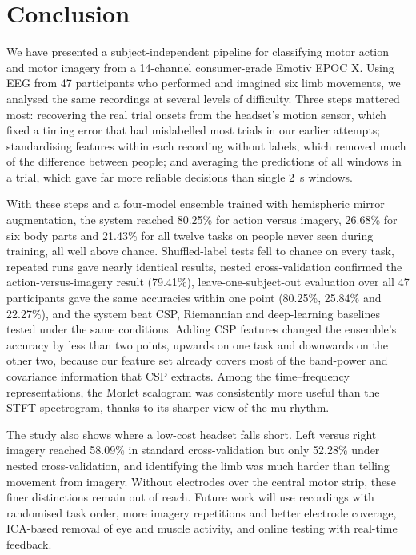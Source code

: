 \documentclass[pdflatex,sn-mathphys-num]{sn-jnl}%
\theoremstyle{thmstyleone}%
\theoremstyle{thmstyletwo}%
\theoremstyle{thmstylethree}%
\begin{document}
\FloatBarrier
\section{Conclusion}\label{sec:conclusion}

We have presented a subject-independent pipeline for classifying motor action and motor imagery from a 14-channel consumer-grade Emotiv EPOC X. Using EEG from 47 participants who performed and imagined six limb movements, we analysed the same recordings at several levels of difficulty. Three steps mattered most: recovering the real trial onsets from the headset's motion sensor, which fixed a timing error that had mislabelled most trials in our earlier attempts; standardising features within each recording without labels, which removed much of the difference between people; and averaging the predictions of all windows in a trial, which gave far more reliable decisions than single 2~s windows.

With these steps and a four-model ensemble trained with hemispheric mirror augmentation, the system reached 80.25\% for action versus imagery, 26.68\% for six body parts and 21.43\% for all twelve tasks on people never seen during training, all well above chance. Shuffled-label tests fell to chance on every task, repeated runs gave nearly identical results, nested cross-validation confirmed the action-versus-imagery result (79.41\%), leave-one-subject-out evaluation over all 47 participants gave the same accuracies within one point (80.25\%, 25.84\% and 22.27\%), and the system beat CSP, Riemannian and deep-learning baselines tested under the same conditions. Adding CSP features changed the ensemble's accuracy by less than two points, upwards on one task and downwards on the other two, because our feature set already covers most of the band-power and covariance information that CSP extracts. Among the time--frequency representations, the Morlet scalogram was consistently more useful than the STFT spectrogram, thanks to its sharper view of the mu rhythm.

The study also shows where a low-cost headset falls short. Left versus right imagery reached 58.09\% in standard cross-validation but only 52.28\% under nested cross-validation, and identifying the limb was much harder than telling movement from imagery. Without electrodes over the central motor strip, these finer distinctions remain out of reach. Future work will use recordings with randomised task order, more imagery repetitions and better electrode coverage, ICA-based removal of eye and muscle activity, and online testing with real-time feedback.
\end{document}
